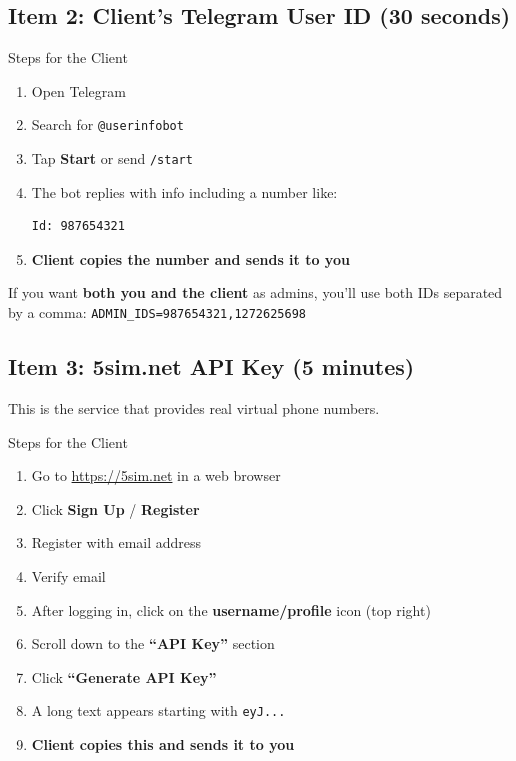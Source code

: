 \subsection{Item 2: Client's Telegram User ID (30 seconds)}

\begin{stepbox}{Steps for the Client}
\begin{enumerate}[leftmargin=1.5cm]
    \item Open Telegram
    \item Search for \texttt{@userinfobot}
    \item Tap \textbf{Start} or send \texttt{/start}
    \item The bot replies with info including a number like:
    \begin{lstlisting}[style=termstyle]
Id: 987654321
    \end{lstlisting}
    \item \textbf{Client copies the number and sends it to you}
\end{enumerate}
\end{stepbox}

\begin{tipbox}
If you want \textbf{both you and the client} as admins, you'll use both IDs separated by a comma: \texttt{ADMIN\_IDS=987654321,1272625698}
\end{tipbox}

\subsection{Item 3: 5sim.net API Key (5 minutes)}

This is the service that provides real virtual phone numbers.

\begin{stepbox}{Steps for the Client}
\begin{enumerate}[leftmargin=1.5cm]
    \item Go to \url{https://5sim.net} in a web browser
    \item Click \textbf{Sign Up} / \textbf{Register}
    \item Register with email address
    \item Verify email
    \item After logging in, click on the \textbf{username/profile} icon (top right)
    \item Scroll down to the \textbf{``API Key''} section
    \item Click \textbf{``Generate API Key''}
    \item A long text appears starting with \texttt{eyJ...}
    \item \textbf{Client copies this and sends it to you}
\end{enumerate}
\end{stepbox}

